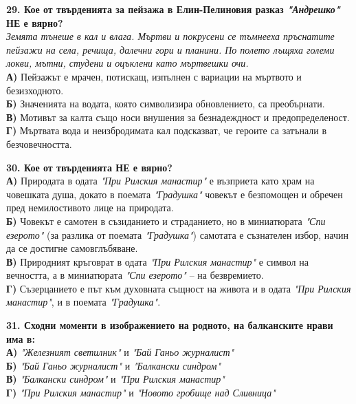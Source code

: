 \documentclass[12pt,a4paper]{article}
\begin{document}
\noindent
\textbf{29. Кое от твърденията за пейзажа в Елин-Пелиновия разказ \textit{"Андрешко"} НЕ е вярно?} \\[0.5em]
\noindent
\textit{Земята тънеше в кал и влага. Мъртви и покрусени се тъмнееха пръснатите пейзажи на села, речища, далечни гори и планини. По полето лъщяха големи локви, мътни, студени и оцъклени като мъртвешки очи.} \\[0.6cm]
\noindent
\textbf{А)} Пейзажът е мрачен, потискащ, изпълнен с вариации на мъртвото и безизходното. \\
\textbf{Б)} Значенията на водата, която символизира обновлението, са преобърнати. \\
\textbf{В)} Мотивът за калта също носи внушения за безнадеждност и предопределеност. \\
\textbf{Г)} Мъртвата вода и неизбродимата кал подсказват, че героите са затънали в безчовечността.

\vspace{0.6cm}

\noindent
\textbf{30. Кое от твърденията НЕ е вярно?} \\
\noindent
\textbf{А)} Природата в одата \textit{"При Рилския манастир"} е възприета като храм на човешката душа, докато в поемата \textit{"Градушка"} човекът е безпомощен и обречен пред немилостивото лице на природата. \\
\textbf{Б)} Човекът е самотен в съзиданието и страданието, но в миниатюрата \textit{"Спи езерото"} (за разлика от поемата \textit{"Градушка"}) самотата е съзнателен избор, начин да се достигне самовглъбяване. \\
\textbf{В)} Природният кръговрат в одата \textit{"При Рилския манастир"} е символ на вечността, а в миниатюрата \textit{"Спи езерото"} -- на безвремието. \\
\textbf{Г)} Съзерцанието е път към духовната същност на живота и в одата \textit{"При Рилския манастир"}, и в поемата \textit{"Градушка"}.

\vspace{0.6cm}

\noindent
\textbf{31. Сходни моменти в изображението на родното, на балканските нрави има в:} \\
\noindent
\textbf{А)} \textit{"Железният светилник"} и \textit{"Бай Ганьо журналист"} \\
\textbf{Б)} \textit{"Бай Ганьо журналист"} и \textit{"Балкански синдром"} \\
\textbf{В)} \textit{"Балкански синдром"} и \textit{"При Рилския манастир"} \\
\textbf{Г)} \textit{"При Рилския манастир"} и \textit{"Новото гробище над Сливница"}
\end{document}
